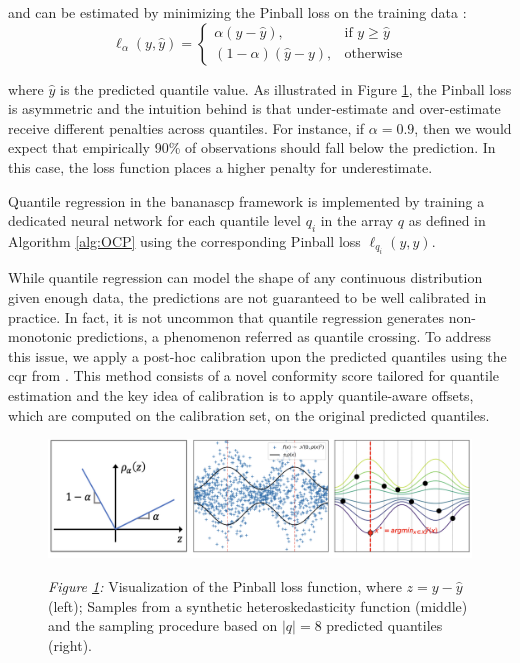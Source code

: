 {\begin{description}[leftmargin=0cm, listparindent=\parindent]
	\noindent and can be estimated by minimizing the Pinball loss on the training data \cite{koenker1978regression}:
		\begin{equation}
			\ell_\alpha(y, \hat{y}) = 
			\begin{cases}
			\alpha (y - \hat{y}), & \text{if } y \geq \hat{y} \\
			(1 - \alpha)(\hat{y} - y), & \text{otherwise}
			\end{cases}
		\label{pinballloss}
		\end{equation}
		
	\noindent where $\hat{y}$ is the predicted quantile value.	 As illustrated in Figure \ref{fig:CQR}, the Pinball loss is asymmetric and the intuition behind is that under-estimate and over-estimate receive different penalties across quantiles. 	For instance, if $\alpha=0.9$, then we would expect that empirically 90\% of observations should fall below the prediction. In this case, the loss function places a higher penalty for underestimate.	
	
	Quantile regression in the \gls{bananascp} framework is implemented by training a dedicated neural network for each quantile level $q_i$ in the array $q$ as defined in Algorithm \ref{alg:OCP} using the corresponding Pinball loss $\ell_{q_i}(y, \hat{y})$. 
	
	 While quantile regression can model the shape of any continuous distribution given enough data, the predictions are not guaranteed to be well calibrated in practice. In fact, it is not uncommon that quantile regression generates non-monotonic predictions, a phenomenon referred as quantile crossing. To address this issue, we apply a post-hoc calibration upon the predicted quantiles using the \gls{cqr} from \cite{romano2019conformalized}. This method consists of a novel conformity score tailored for quantile estimation and the key idea of calibration is to apply quantile-aware offsets, which are computed on the calibration set, on the original predicted quantiles. 
		 
	 \begin{figure}[t]	
		\includegraphics[scale=0.56]{figs/pinball_loss_and_CQR.png}
		\label{fig:CQR}
		{\small \textit{Figure \ref{fig:CQR}:} Visualization of the Pinball loss function, where $z=y - \hat{y}$ \cite{romano2019conformalized} (left); Samples from a synthetic heteroskedasticity function (middle) and  the sampling procedure based on $|q| = 8$ predicted quantiles \cite{salinas2023optimizing} (right).
		}
	\end{figure}
	 

\end{description}}
